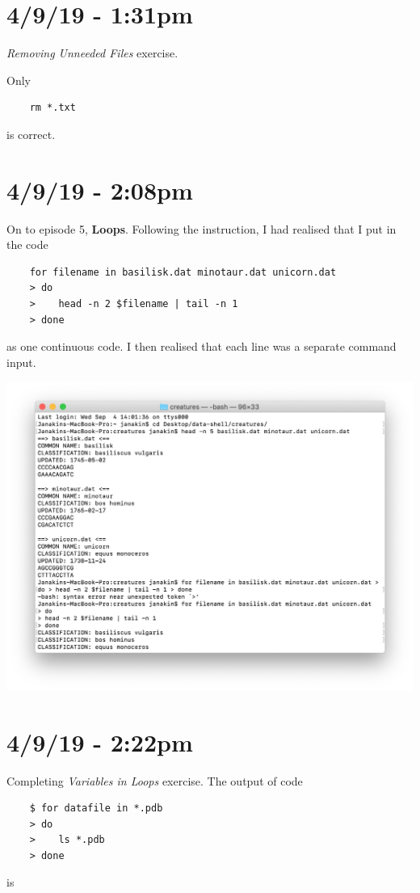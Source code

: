 \documentclass{article}
\begin{document}
\section*{4/9/19 - 1:31pm}

\textit{Removing Unneeded Files} exercise.

Only \begin{verbatim}
    rm *.txt
\end{verbatim} is correct.

\section*{4/9/19 - 2:08pm}

On to episode 5, \textbf{Loops}. Following the instruction, I had realised that I put in the code \begin{verbatim}
    for filename in basilisk.dat minotaur.dat unicorn.dat
    > do
    >    head -n 2 $filename | tail -n 1
    > done
\end{verbatim} as one continuous code. I then realised that each line was a separate command input.

\includegraphics[width=\textwidth]{figm.png}

\section*{4/9/19 - 2:22pm}

Completing \textit{Variables in Loops} exercise. The output of code \begin{verbatim}
    $ for datafile in *.pdb
    > do
    >    ls *.pdb
    > done
\end{verbatim} is
\end{document}
